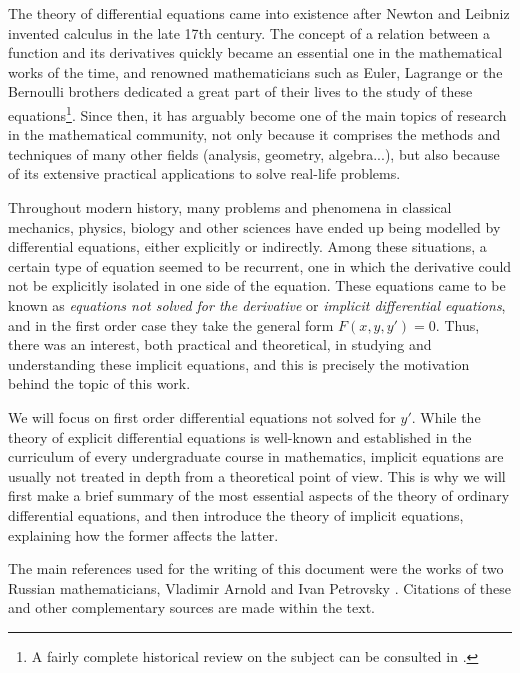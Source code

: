 %
%
%

The theory of differential equations came into existence after Newton and Leibniz invented calculus in the late 17th century. The concept of a relation between a function and its derivatives quickly became an essential one in the mathematical works of the time, and renowned mathematicians such as Euler, Lagrange or the Bernoulli brothers dedicated a great part of their lives to the study of these equations\footnote{A fairly complete historical review on the subject can be consulted in \cite{archibald2004history}.}. Since then, it has arguably become one of the main topics of research in the mathematical community, not only because it comprises the methods and techniques of many other fields (analysis, geometry, algebra...), but also because of its extensive practical applications to solve real-life problems.

Throughout modern history, many problems and phenomena in classical mechanics, physics, biology and other sciences have ended up being modelled by differential equations, either explicitly or indirectly. Among these situations, a certain type of equation seemed to be recurrent, one in which the derivative could not be explicitly isolated in one side of the equation. These equations came to be known as \textit{equations not solved for the derivative} or \textit{implicit differential equations}, and in the first order case they take the general form $F(x,y,y')=0$. Thus, there was an interest, both practical and theoretical, in studying and understanding these implicit equations, and this is precisely the motivation behind the topic of this work.

We will focus on first order differential equations not solved for $y'$. While the theory of explicit differential equations is well-known and established in the curriculum of every undergraduate course in mathematics, implicit equations are usually not treated in depth from a theoretical point of view. This is why we will first make a brief summary of the most essential aspects of the theory of ordinary differential equations, and then introduce the theory of implicit equations, explaining how the former affects the latter.

The main references used for the writing of this document were the works of two Russian mathematicians, Vladimir Arnold \cite{arnold2012geometrical, cooke1992ordinary} and Ivan Petrovsky \cite{petrovski1966ordinary}. Citations of these and other complementary sources are made within the text.

